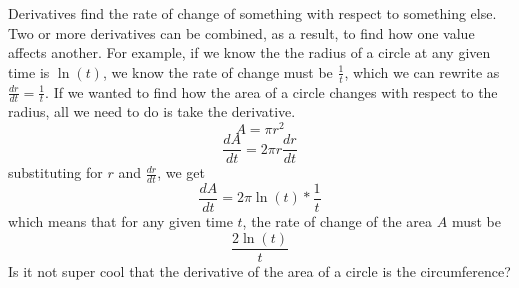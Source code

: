 \documentclass[../revisedmain.tex]{subfiles}
\begin{document}
	Derivatives find the rate of change of something with respect to something else. Two or more derivatives can be combined, as a result, to find how one value affects another. For example, if we know the the radius of a circle at any given time is $\ln(t)$, we know the rate of change must be $\displaystyle\frac{1}{t}$, which we can rewrite as $\displaystyle\frac{dr}{dt}=\displaystyle\frac{1}{t}$. If we wanted to find how the area of a circle changes with respect to the radius, all we need to do is take the derivative. $$A=\pi r^2$$$$\frac{dA}{dt}=2\pi r\frac{dr}{dt}$$ substituting for $r$ and $\displaystyle\frac{dr}{dt}$, we get $$\frac{dA}{dt}=2 \pi \ln(t) * \frac{1}{t}$$ which means that for any given time $t$, the rate of change of the area $A$ must be $$\frac{2\ln(t)}{t}$$ Is it not super cool that the derivative of the area of a circle is the circumference?
\end{document}

